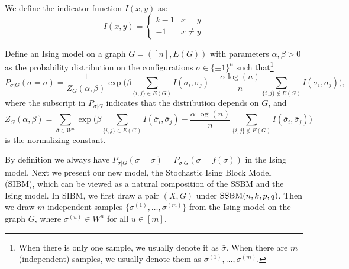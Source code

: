 \documentclass{article}
\begin{document}
We define the indicator function $I(x, y)$ as:
\begin{equation}
I(x, y) = \begin{cases}
 k-1 & x = y \\
 -1 & x \neq y
\end{cases}
\end{equation}

 
 \begin{definition}
Define an Ising model on a graph $G=([n],E(G))$ with parameters $\alpha,\beta>0$ as the probability distribution on the configurations $\sigma\in\{\pm 1\}^n$ such that\footnote{When there is only one sample, we usually denote it as $\bar{\sigma}$. When there are $m$ (independent) samples, we usually denote them as $\sigma^{(1)},\dots,\sigma^{(m)}$.}
\begin{equation} \label{eq:isingma}
P_{\sigma|G}(\sigma=\bar{\sigma})=\frac{1}{Z_G(\alpha,\beta)}
\exp\Big(\beta\sum_{\{i,j\}\in E(G)} I(\bar{\sigma}_i ,\bar{\sigma}_j)
-\frac{\alpha\log(n)}{n} \sum_{\{i,j\}\notin E(G)} I(\bar{\sigma}_i, \bar{\sigma}_j)\Big) ,
\end{equation}
where the subscript in $P_{\sigma|G}$ indicates that the distribution depends on $G$, and 
\begin{equation}  \label{eq:zg}
Z_G(\alpha,\beta)=\sum_{\bar{\sigma} \in W^n} \exp\Big(\beta\sum_{\{i,j\}\in E(G)}I(\bar{\sigma}_i, \bar{\sigma}_j)
-\frac{\alpha\log(n)}{n} \sum_{\{i,j\}\notin E(G)} I(\bar{\sigma}_i, \bar{\sigma}_j) \Big) 
\end{equation}
is the normalizing constant.
\end{definition}






By definition we always have $P_{\sigma|G}(\sigma=\bar{\sigma})=P_{\sigma|G}(\sigma=f(\bar{\sigma}))$ in the Ising model. Next we present our new model, the Stochastic Ising Block Model (SIBM), which can be viewed as a natural composition of the SSBM and the Ising model. In SIBM, we first draw a pair $(X,G)$ under $\operatorname{SSBM}(n,k, p,q)$.  Then we draw $m$ independent samples $\{\sigma^{(1)},\dots,\sigma^{(m)}\}$ from the Ising model on the graph $G$, where $\sigma^{(u)}\in W^n$ for all $u\in[m]$.
\end{document}
